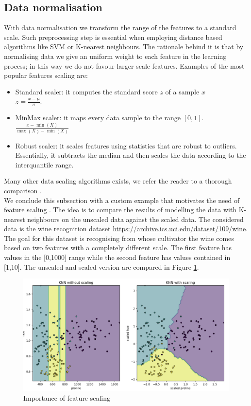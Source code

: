 \subsection{Data normalisation}\label{appendix:normalization}
With data normalisation we transform the range of the features to a standard scale.
Such preprocessing step is essential when employing distance based algorithms like SVM or K-nearest neighbours. The rationale behind it is that by normalising data we give an uniform weight to each feature in the learning process; in this way we do not favour larger scale features.
Examples of the most popular features scaling are:
\begin{itemize}
    \item Standard scaler: it computes the standard score $z$ of a sample $x$
    \\
    $z=\frac{x-\mu}{\sigma}$.
    \item MinMax scaler: it maps every data sample to the range $[0,1]$.
    \\
    $\frac{x-\min(X)}{\max(X)-\min(X)}$
    \item Robust scaler: it scales features using statistics that are robust to outliers.
    Essentially, it subtracts the median and then scales the data according to the interquantile range.
\end{itemize}
Many other data scaling algorithms exists, we refer the reader to a thorough comparison .
\\
We conclude this subsection with a custom example that motivates the need of feature scaling . The idea is to compare the results of modelling the data with K-nearest neighbours on the unscaled data against the scaled data. The considered data is the wine recognition dataset \url{https://archive.ics.uci.edu/dataset/109/wine}. The goal for this dataset is recognising from whose cultivator the wine comes based on two features with a completely different scale. The first feature has values in the [0,1000] range while the second feature has values contained in [1,10].
The unscaled and scaled version are compared in Figure \ref{fig:feature_scaler_example}.
\begin{figure}[!h]
    \includegraphics[width=\textwidth]{images/feature_scaler_example.png}
    \caption[Importance of feature scaling]{Importance of feature scaling }
    \label{fig:feature_scaler_example}
\end{figure}
